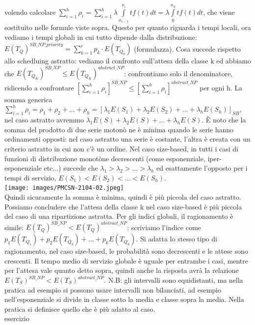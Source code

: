 \documentclass{article}
\begin{document}
volendo calcolare $\sum\limits_{i=1}^{h} \rho_i = \sum\limits_{i=1}^{h} \lambda \int\limits_{x_{i-1}}^{x_i} tf(t) dt = \lambda \int\limits_{0}^{x_h} t f(t) dt$, che viene sostituito nelle formule viste sopra. Questo per quanto riguarda i tempi locali, ora vediamo i tempi globali in cui tutto dipende dalla distribuzione: $E(T_Q)^{SB\_NP\_priority} = \sum\limits_{k=1}^{r}p_k \cdot E(T_{Q_k})$ (formulazza). Cosa succede rispetto allo schedluing astratto: vediamo il confronto sull'attesa della classe k ed abbiamo che $E(T_{Q_K})^{SB\_NP} \leq E(T_{Q_K})^{abstract\_NP}$: confrontiamo solo il denominatore, ridicendo a confrontare $[\sum\limits_{i=1}^{h} \rho_i]^{SB\_NP} \leq [\sum\limits_{i=1}^{h} \rho_i]^{abstract\_NP}$ per ogni h. La somma generica $\sum\limits_{i=1}^{h} \rho_i = \rho_1 + \rho_2 + ... + \rho_h = [\lambda_1E(S_1) + \lambda_2E(S_2) + ... +\lambda_hE(S_h)]_{SB}$, nel caso astratto avremmo $\lambda_1E(S)+\lambda_2E(S) +...+\lambda_hE(S)$. È noto che la somma del prodotto di due serie motonò ne è minima quando le serie hanno ordinamenti opposti: nel caso astratto una serie è costante, l'altra è creata con un criterio astratto in cui non c'è un ordine. Nel caso size-based, in tutti i casi di funzioni di distribuzione monotòne decrescenti (come esponenziale, iper-esponenziale etc...) succede che $\lambda_1 > \lambda_2 > ... >\lambda_h$ ed esattamente l'opposto per i tempi di servizio, $E(S_1) < E(S_2) < ... < E(S_h)$.\\ 
\texttt{[image: images/PMCSN-2104-02.jpeg]}\\
Quindi sicuramente la somma è minima, quindi è più piccola del caso astratto. Possiamo concludere che l'attesa della classe k nel caso size-based è più piccola del caso di una ripartizione astratta. Per gli indici globali, il ragionamento è simile: $E(T_Q)^{SB\_NP} < E(T_Q)^{abstract\_NP}$: scriviamo l'indice come $p_1E(T_{Q_1}) + p_2E(T_{Q_2}) + ... +p_kE(T_{Q_k})$. Si adatta lo stesso tipo di ragionamento, nel caso size-based, le probabilità sono decrescenti e le attese sono crescenti. Il tempo medio di servizio globale è uguale per entrambe i casi, mentre per l'attesa vale quanto detto sopra, quindi anche la risposta avrà la relazione $E(T_S)^{SB\_NP} < E(T_S)^{abstract\_NP}$.
N.B: gli intervalli sono equidistanti, ma nella pratica ad esempio si possono usare intervalli non bilanciati, ad esempio nell'esponenziale si divide in classe sotto la media e classe sopra la media. Nella pratica si definisce quello che è più adatto al caso.\\ esercizio\\ 
\end{document}
